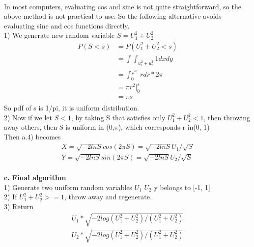 \documentclass[a4paper]{article}
\begin{document}
 \\
In most computers, evaluating cos and sine is not quite straightforward, so the above method is not practical to use. So the following alternative avoids evaluating sine and cos functions directly.\\
1)	We generate new random variable $S = U_1^2 + U_2^2$
\begin{align*}
 P(S<s) &= P(U_1^2 + U_2^2 <s) \\
& = \int\int_{u_1^2 + u_2^2} 1 dx dy\\
& = \int_0 ^{\sqrt{s}} r dr *2\pi \\
& = \pi r^2|_0^s \\
& = \pi s \\
\end{align*}
So pdf of s is 1/pi, it is uniform distribution.\\
2)	Now if we let $S<1$, by taking S that satisfies only $U_1^2 + U_2^2 <1$, then throwing away others, then S is uniform in (0,$\pi$), which corresponds r in(0, 1)\\
Then a.4) becomes\\
\begin{align*}
X = \sqrt{-2 ln S} cos(2\pi S) =\sqrt{-2 ln S} U_1/\sqrt{S} \\
Y = \sqrt{-2 ln S} sin(2\pi S) = \sqrt{-2 ln S} U_2/\sqrt{S} \\
\end{align*}


{\bf c.	Final algorithm} \\
1)	Generate two uniform random variables $U_1$ $U_2$ y belongs to [-1, 1]\\
2)	If $U_1^2 + U_2^2 >=1$, throw away and regenerate.\\
3)	Return\\ 
\begin{align*}
    U_1 * \sqrt{-2 log (U_1^2 + U_2^2) / (U_1^2 + U_2 ^2)}\\
    U_2 * \sqrt{-2 log (U_1^2 + U_2^2) / (U_1^2 + U_2 ^2)}\\
\end{align*}
\end{document}
